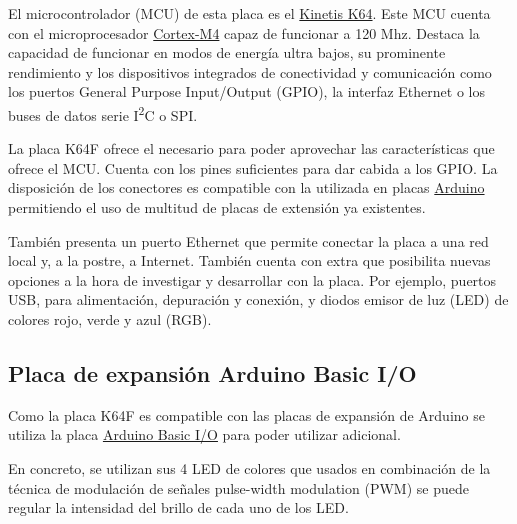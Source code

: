 
El microcontrolador (MCU) de esta placa es el \href{https://www.nxp.com/products/processors-and-microcontrollers/arm-based-processors-and-mcus/kinetis-cortex-m-mcus/k-seriesperformancem4/k6x-ethernet/kinetis-k64-120-mhz-256kb-sram-microcontrollers-mcus-based-on-arm-cortex-m4-core:K64_120}
{Kinetis K64}. Este MCU cuenta con el microprocesador \href{https://developer.arm.com/products/processors/cortex-m/cortex-m4}
{Cortex-M4} capaz de funcionar a 120 Mhz. Destaca la capacidad de funcionar en 
modos de energía ultra bajos, su prominente rendimiento y los dispositivos
integrados de conectividad y comunicación como los puertos General Purpose
Input/Output (GPIO), la interfaz Ethernet o los buses de datos serie
I\textsuperscript{2}C o SPI.

La placa K64F ofrece el  necesario para poder aprovechar
las características que ofrece el MCU. Cuenta con los pines suficientes para dar 
cabida a los GPIO. La disposición de los conectores es compatible con la
utilizada en placas \href{https://www.arduino.cc/}{Arduino} permitiendo el uso
de multitud de placas de extensión ya existentes.

También presenta un puerto Ethernet que permite conectar la placa a una red
local y, a la postre, a Internet. También cuenta con 
extra que posibilita nuevas opciones a la hora de investigar y desarrollar con
la placa. Por ejemplo, puertos USB, para alimentación, depuración y conexión, y
diodos emisor de luz (LED) de colores rojo, verde y azul (RGB).

\subsection{Placa de expansión Arduino Basic I/O}{\label{sec:basic-io}}
Como la placa K64F es compatible con las placas de expansión de Arduino se
utiliza la placa \href{https://web.archive.org/web/20160818213905/http://www.msebilbao.com/tienda/product_info.php?cPath=130&products_id=793&osCsid=f967e6ddeaaa2f19050972ff62295a08}
{Arduino Basic I/O} para poder utilizar  adicional.


En concreto, se utilizan sus 4 LED de colores que usados en combinación de la
técnica de modulación de señales pulse-width modulation (PWM) se puede regular
la intensidad del brillo de cada uno de los LED.

